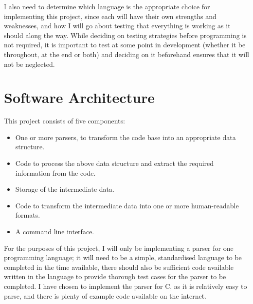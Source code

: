 I also need to determine which language is the appropriate choice for
implementing this project, since each will have their own strengths and
weaknesses, and how I will go about testing that everything is working as it
should along the way. While deciding on testing strategies before programming is
not required, it is important to test at some point in development (whether it
be throughout, at the end or both) and deciding on it beforehand ensures that it
will not be neglected.

\section{Software Architecture}
\begin{center}
  \vspace*{5mm}
\end{center}

This project consists of five components:
\begin{itemize}
  \item One or more parsers, to transform the code base into an appropriate data
    structure.
  \item Code to process the above data structure and extract the required
    information from the code.
  \item Storage of the intermediate data.
  \item Code to transform the intermediate data into one or more human-readable
    formats.
  \item A command line interface.
\end{itemize}

For the purposes of this project, I will only be implementing a parser for one
programming language; it will need to be a simple, standardised language to be
completed in the time available, there should also be sufficient code available
written in the language to provide thorough test cases for the parser to be
completed. I have chosen to implement the parser for C, as it is relatively easy
to parse, and there is plenty of example code available on the internet.

